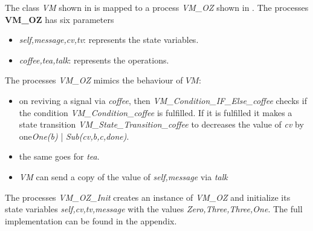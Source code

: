 The class \textit{VM} shown in  is mapped to a \picalc{} process \textit{VM\_OZ} shown in . The processes \textbf{VM\_OZ} has six parameters
\begin{itemize}
\item \textit{self,message,cv,tv}: represents the state variables.
\item \textit{coffee,tea,talk}: represents the operations.
\end{itemize}
The processes \textit{VM\_OZ} mimics the behaviour of $VM$:
\begin{itemize}
\item on reviving a signal via \textit{coffee}, then \textit{VM\_Condition\_IF\_Else\_coffee} checks if the condition \textit{VM\_Condition\_coffee} is fulfilled. If it is fulfilled it makes a state transition \textit{VM\_State\_Transition\_coffee} to decreases the value of \textit{cv} by one\textit{One(b) }| \textit{Sub(cv,b,c,done)}.
\item the same goes for \textit{tea}.
\item  \textit{VM} can send a copy of the value of  \textit{self,message} via  \textit{talk}
\end{itemize}
The processes \textit{VM\_OZ\_Init} creates an instance of \textit{VM\_OZ} and initialize its state variables \textit{self,cv,tv,message} with the values \textit{Zero,Three,Three,One}. The full implementation can be found in the appendix.

